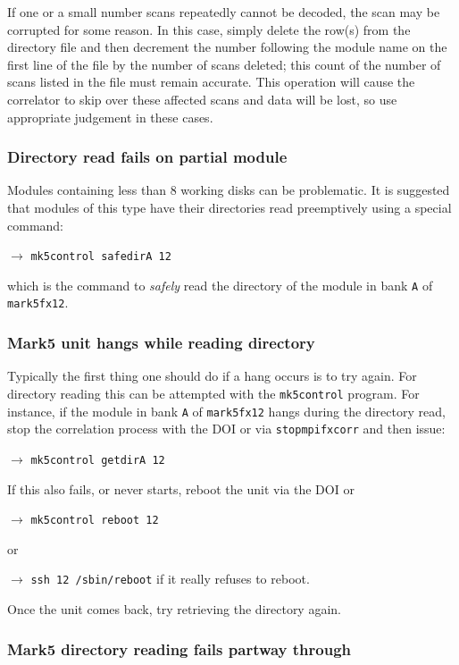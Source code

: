 If one or a small number scans repeatedly cannot be decoded, the scan may be corrupted for some reason.
In this case, simply delete the row(s) from the directory file and then decrement the number following the module name on the first line of the file by the number of scans deleted; this count of the number of scans listed in the file must remain accurate.
This operation will cause the correlator to skip over these affected scans and data will be lost, so use appropriate judgement in these cases.

\subsubsection{Directory read fails on partial module}

Modules containing less than 8 working disks can be problematic.  
It is suggested that modules of this type have their directories read
preemptively using a special command:

\noindent
$\longrightarrow$ {\tt mk5control safedirA 12}

\noindent
which is the command to {\em safely} read the directory of the module in bank {\tt A} of {\tt mark5fx12}.

\subsubsection{Mark5 unit hangs while reading directory}

Typically the first thing one should do if a hang occurs is to try again.
For directory reading this can be attempted with the {\tt mk5control} program.
For instance, if the module in bank {\tt A} of {\tt mark5fx12} hangs during the directory read, stop the correlation process with the DOI or via {\tt stopmpifxcorr} and then issue:

\noindent
$\longrightarrow$ {\tt mk5control getdirA 12}

\noindent
If this also fails, or never starts, reboot the unit via the DOI or

\noindent
$\longrightarrow$ {\tt mk5control reboot 12}

\noindent
or

\noindent
$\longrightarrow$ {\tt ssh 12 /sbin/reboot} if it really refuses to reboot.

Once the unit comes back, try retrieving the directory again.

\subsubsection{Mark5 directory reading fails partway through}

